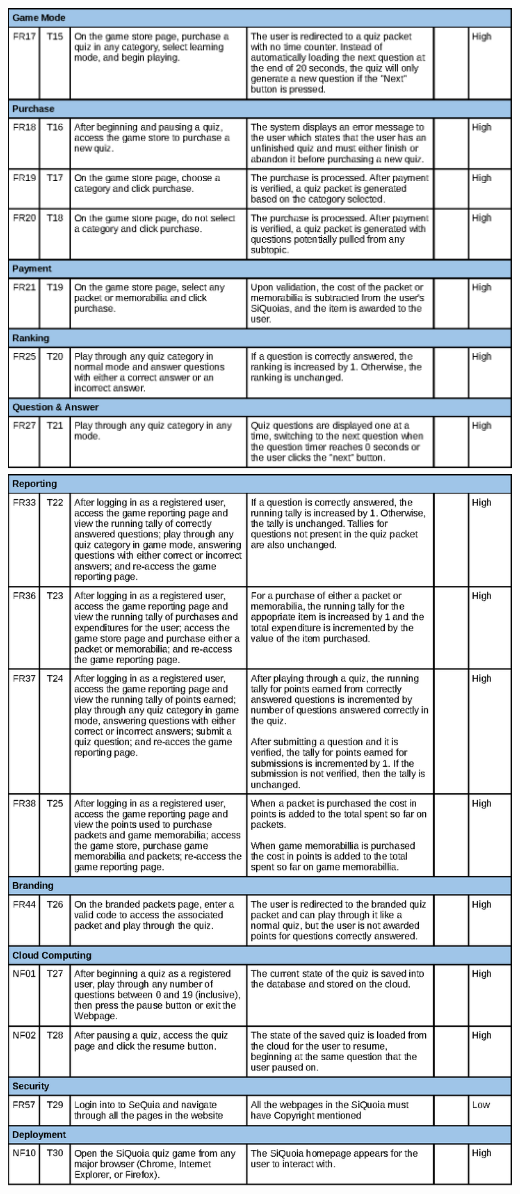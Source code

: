\documentclass[12pt]{article}
\begin{document}
\begin{center}
\includegraphics[width=\textwidth]{tests2}
\newpage
\includegraphics[width=\textwidth]{tests3}
\end{center}
\end{document}
